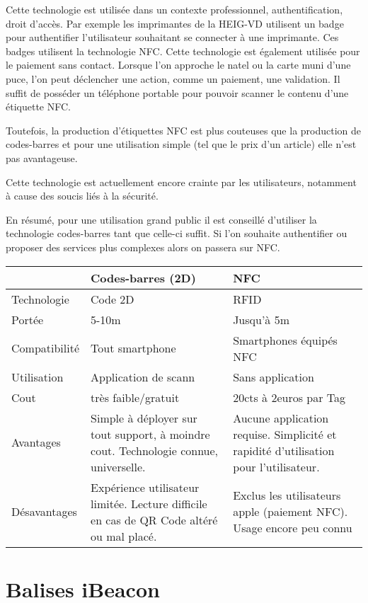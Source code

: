 \documentclass[francais,12pt]{article}
\begin{document}
	Cette technologie est utilisée dans un contexte professionnel, authentification, droit d'accès. Par exemple les imprimantes de la HEIG-VD utilisent un badge pour authentifier l'utilisateur souhaitant se connecter à une imprimante. Ces badges utilisent la technologie NFC. Cette technologie est également utilisée pour le paiement sans contact. Lorsque l'on approche le natel ou la carte muni d'une puce, l'on peut déclencher une action, comme un paiement, une validation.	
	Il suffit de posséder un téléphone portable pour pouvoir scanner le contenu d'une étiquette NFC. 
	
	Toutefois, la production d'étiquettes NFC est plus couteuses que la production de codes-barres et pour une utilisation simple (tel que le prix d'un article) elle n'est pas avantageuse. 
	
	Cette technologie est actuellement encore crainte par les utilisateurs, notamment à cause des soucis liés à la sécurité. 	
	
	En résumé, pour une utilisation grand public il est conseillé d'utiliser la technologie codes-barres tant que celle-ci suffit. Si l'on souhaite authentifier ou proposer des services plus complexes alors on passera sur NFC.
		
	\begin{tabular}{|l|p{6cm}|p{6cm}|}
		\hline 
		\rowcolor{lightgray}& Codes-barres (2D) & NFC \\ 
		\hline 
		Technologie & Code 2D  & RFID  \\ 
		\hline 
		Portée & 5-10m  & Jusqu'à 5m \\ 
		\hline 
		Compatibilité & Tout smartphone  & Smartphones équipés NFC  \\ 
		\hline 
		Utilisation & Application de scann & Sans application \\ 
		\hline 
		Cout &  très faible/gratuit & 20cts à 2euros par Tag \\ 
		\hline 
		Avantages & Simple à déployer sur tout support, à moindre cout. Technologie connue, universelle.  & Aucune application requise. Simplicité et rapidité d'utilisation pour l'utilisateur. \\ 
		\hline 
		Désavantages & Expérience utilisateur limitée. Lecture difficile en cas de QR Code altéré ou mal placé. & Exclus les utilisateurs apple (paiement NFC). Usage encore peu connu \\ 
		\hline 
	\end{tabular} 
	
	\section*{Balises iBeacon}
\end{document}
